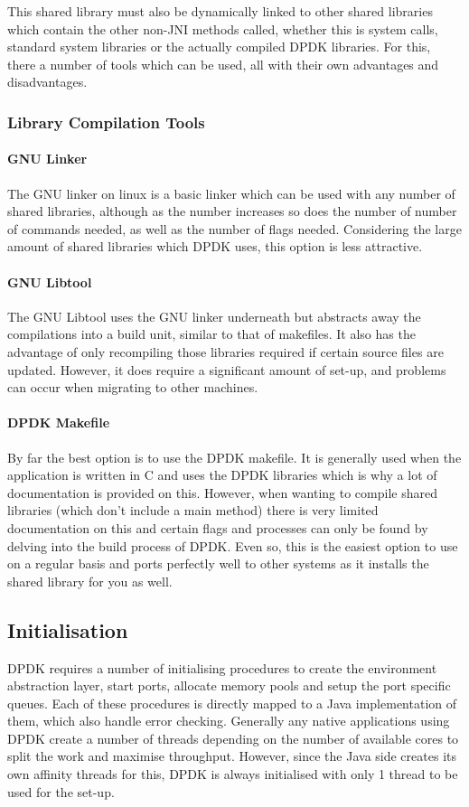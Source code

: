 \documentclass[final_report.tex]{subfiles}
\begin{document}
This shared library must also be dynamically linked to other shared libraries which contain the other non-JNI methods called, whether this is system calls, standard system libraries or the actually compiled DPDK libraries. For this, there a number of tools which can be used, all with their own advantages and disadvantages.

\subsubsection{Library Compilation Tools}

\paragraph*{GNU Linker}
The GNU linker on linux is a basic linker which can be used with any number of shared libraries, although as the number increases so does the number of number of commands needed, as well as the number of flags needed. Considering the large amount of shared libraries which DPDK uses, this option is less attractive.

\paragraph*{GNU Libtool}
The GNU Libtool uses the GNU linker underneath but abstracts away the compilations into a build unit, similar to that of makefiles. It also has the advantage of only recompiling those libraries required if certain source files are updated. However, it does require a significant amount of set-up, and problems can occur when migrating to other machines.

\paragraph*{DPDK Makefile}
By far the best option is to use the DPDK makefile. It is generally used when the application is written in C and uses the DPDK libraries which is why a lot of documentation is provided on this. However, when wanting to compile shared libraries (which don't include a main method) there is very limited documentation on this and certain flags and processes can only be found by delving into the build process of DPDK. Even so, this is the easiest option to use on a regular basis and ports perfectly well to other systems as it installs the shared library for you as well.

\subsection{Initialisation}
DPDK requires a number of initialising procedures to create the environment abstraction layer, start ports, allocate memory pools and setup the port specific queues. Each of these procedures is directly mapped to a Java implementation of them, which also handle error checking. Generally any native applications using DPDK create a number of threads depending on the number of available cores to split the work and maximise throughput. However, since the Java side creates its own affinity threads for this, DPDK is always initialised with only 1 thread to be used for the set-up.
\end{document}
